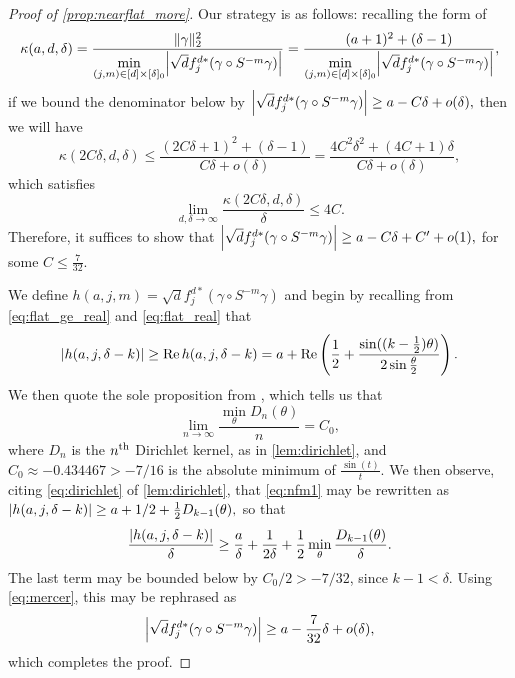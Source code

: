 \begin{proof}[Proof of \cref{prop:nearflat_more}]
  Our strategy is as follows: recalling the form of \[\kappa(a, d, \delta) = \dfrac{\norm{\gamma}_2^2}{\min\limits_{(j, m) \in [d] \times [\delta]_0}\abs*{\sqrt{d} f_j^{d*} (\gamma \circ S^{-m} \gamma)}} = \dfrac{(a + 1)^2 + (\delta - 1)}{\min\limits_{(j, m) \in [d] \times [\delta]_0}\abs*{\sqrt{d} f_j^{d*} (\gamma \circ S^{-m} \gamma)}},\] if we bound the denominator below by $\abs*{\sqrt{d} f_j^{d*} (\gamma \circ S^{-m} \gamma)} \ge a - C \delta + o(\delta),$ then we will have \[\kappa(2 C \delta, d, \delta) \le \dfrac{(2 C \delta + 1)^2 + (\delta - 1)}{C \delta + o(\delta)} = \dfrac{4 C^2 \delta^2 + (4 C + 1) \delta}{C \delta + o(\delta)},\] which satisfies \[\lim_{d, \delta \to \infty} \dfrac{\kappa(2 C \delta, d, \delta)}{\delta} \le 4 C.\]  Therefore, it suffices to show that $\abs*{\sqrt{d} f_j^{d*} (\gamma \circ S^{-m} \gamma)} \ge a - C \delta + C' + o(1),$ for some $C \le \frac{7}{32}$.

  We define $h(a, j, m) = \sqrt{d} f_j^{d*} (\gamma \circ S^{-m} \gamma)$ and begin by recalling from \eqref{eq:flat_ge_real} and \eqref{eq:flat_real} that \begin{equation} \abs{h(a, j, \delta - k)} \ge \Re h(a, j, \delta - k) = a + \Re\left(\frac{1}{2} + \dfrac{\sin((k - \frac{1}{2}) \theta)}{2 \sin \frac{\theta}{2}}\right).\label{eq:nfm1}\end{equation}  We then quote the sole proposition from \cite{mercerXXXXdirichlet}, which tells us that \begin{equation}\lim_{n \to \infty} \dfrac{\min_\theta D_n(\theta)}{n} = C_0,\label{eq:mercer}\end{equation} where $D_n$ is the $n\th$ Dirichlet kernel, as in \cref{lem:dirichlet}, and $C_0 \approx -0.434467 > -7 / 16$ is the absolute minimum of $\frac{\sin(t)}{t}$.  We then observe, citing \eqref{eq:dirichlet} of \cref{lem:dirichlet}, that \eqref{eq:nfm1} may be rewritten as $\abs{h(a, j, \delta - k)} \ge a + 1/2 + \frac{1}{2} D_{k - 1}(\theta),$ so that \[\dfrac{\abs{h(a, j, \delta - k)}}{\delta} \ge \frac{a}{\delta} + \frac{1}{2 \delta} + \frac{1}{2} \min_\theta \frac{D_{k - 1}(\theta)}{\delta}.\]  The last term may be bounded below by $C_0 / 2 > -7 / 32$, since $k - 1 < \delta$.  Using \eqref{eq:mercer}, this may be rephrased as \[\abs*{\sqrt{d} f_j^{d*} (\gamma \circ S^{-m} \gamma)} \ge a - \frac{7}{32} \delta + o(\delta),\] which completes the proof.
\end{proof}
